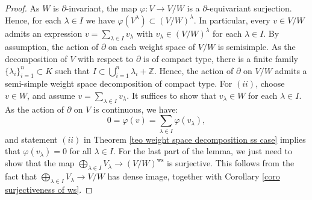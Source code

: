 \documentclass{amsart}
\begin{document}
\begin{proof}
As $W$ is $\partial$-invariant, the map $\varphi:V\rightarrow V/W$ is a $\partial$-equivariant surjection. Hence, for each $\lambda\in I$ we have $\varphi(V^{\lambda})\subset (V/W)^{\lambda}$. In particular, every $v\in V/W$ admits an expression $v=\sum_{\lambda\in I}v_{\lambda}$ with $v_{\lambda}\in (V/W)^{\lambda}$ for each $\lambda \in I$. By assumption, the action of $\partial$ on each weight space of $V/W$ is semisimple. As the decomposition of $V$ with respect to $\partial$ is of compact type, there is a finite family $\{\lambda_i  \}_{i=1}^n\subset K$ such that $I\subset \bigcup_{i=1}^n\lambda_i+\mathbb{Z}$. Hence, the action of $\partial$ on $V/W$ admits a  semi-simple weight space decomposition of compact type. For $(ii)$, choose $v\in W$, and assume $v=\sum_{\lambda\in I}v_{\lambda}$. It suffices to show that  $v_{\lambda}\in W$ for each $\lambda\in I$. As the action of $\partial$ on $V$ is continuous, we have:
\begin{equation*}
    0=\varphi(v)=\sum_{\lambda\in I}\varphi(v_{\lambda}),
\end{equation*}
and statement $(ii)$ in Theorem \ref{teo weight space decomposition ss case} implies that $\varphi(v_{\lambda})=0$ for all $\lambda\in I$. For the last part of the lemma, we just need to show that the map  $\bigoplus_{\lambda\in I}V_{\lambda}\rightarrow (V/W)^{\operatorname{ws}}$ is surjective. This follows from the fact that $\bigoplus_{\lambda\in I}V_{\lambda}\rightarrow V/W$ has dense image, together with Corollary \ref{coro surjectiveness of ws}.   
\end{proof}
\end{document}
